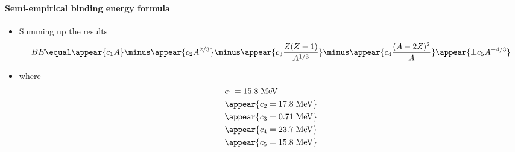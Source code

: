 \begin{frame}
\frametitle{\texorpdfstring{\culine[\sectiontitleulinecolor]{\sectiontitle}}{\sectiontitle} }
\framesubtitle{Semi-empirical binding energy formula}

\begin{itemize}
	\item Summing up the results
	\[
B E \equal \appear{c_{1} A}  \minus \appear{c_{2} A^{2 / 3}}  \minus \appear{c_{3} \frac{Z(Z-1)}{A^{1 / 3}}}  \minus \appear{c_{4} \frac{(A-2 Z)^{2}}{A}} \appear{\pm c_{5} A^{-4 / 3}}
\]
\item[] where 
$$
\begin{aligned}
&c_{1}=15.8 \mathrm{\;MeV} \\
&\appear{c_{2}=17.8 \mathrm{\;MeV}} \\
&\appear{c_{3}=0.71 \mathrm{\;MeV}} \\
&\appear{c_{4}=23.7 \mathrm{\;MeV}} \\
&\appear{c_{5}=15.8 \mathrm{\;MeV}}
\end{aligned}
$$
\end{itemize}


\endofslide 
\end{frame}


